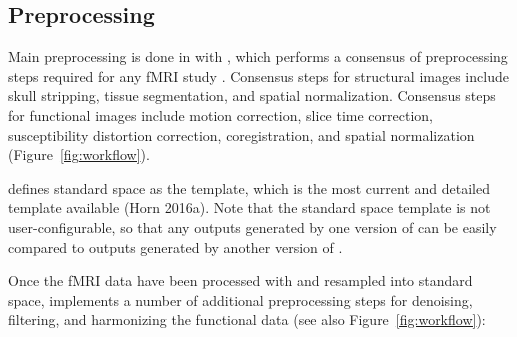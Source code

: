 \subsection{Preprocessing}\label{sec:preprocessing}

Main preprocessing is done in  with , which performs a consensus of preprocessing steps required for any fMRI study \parencite{esteban2019a}. Consensus steps for structural images include skull stripping, tissue segmentation, and spatial normalization. Consensus steps for functional images include motion correction, slice time correction, susceptibility distortion correction, coregistration, and spatial normalization (Figure~\ref{fig:workflow}).

 defines standard space as the  template, which is the most current and detailed template available (Horn 2016a). Note that the standard space template is not user-configurable, so that any outputs generated by one version of  can be easily compared to outputs generated by another version of .

Once the fMRI data have been processed with  and resampled into standard space,  implements a number of additional preprocessing steps for denoising, filtering, and harmonizing the functional data (see also Figure~\ref{fig:workflow}):

